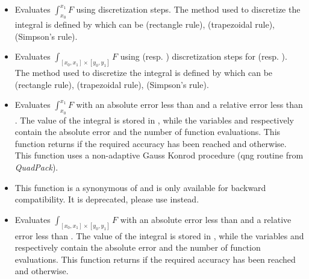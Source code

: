 \begin{itemize}
\item {}
  \sshortdescribe Evaluates $\int_{x_0}^{x_1} F$ using  discretization
  steps. The method used to discretize the integral is defined by 
  which can be  (rectangle rule),  (trapezoidal rule),
   (Simpson's rule).

\item {}
  \sshortdescribe Evaluates $\int_{[x_0, x_1] \times [y_0, y_1]} F$ using
   (resp. ) discretization steps for \var{[x0, x1]}
  (resp. \var{[y0, y1]}). The method used to discretize the integral is
  defined by  which can be  (rectangle rule),
   (trapezoidal rule),    (Simpson's rule).


\item {}
  \sshortdescribe Evaluates $\int_{x_0}^{x_1} F$ with an absolute error less
  than  and a relative error less than . The value of
  the integral is stored in , while the variables  and
   respectively contain the absolute error and the number of function
  evaluations. This function returns  if the required accuracy has been
  reached and  otherwise. This function uses a non-adaptive Gauss
  Konrod procedure (qng routine from {\it QuadPack}).

\item {}
  \sshortdescribe This function is a synonymous of
   and is only available for backward
  compatibility. It is deprecated, please use 
  instead.

\item {}
  \sshortdescribe Evaluates $\int_{[x_0, x_1] \times [y_0, y_1]} F$ with an
  absolute error less than  and a relative error less than
  . The value of the integral is stored in , while the
  variables  and  respectively contain the absolute error
  and the number of function evaluations. This function returns  if the
  required accuracy has been reached and  otherwise.


\end{itemize}
